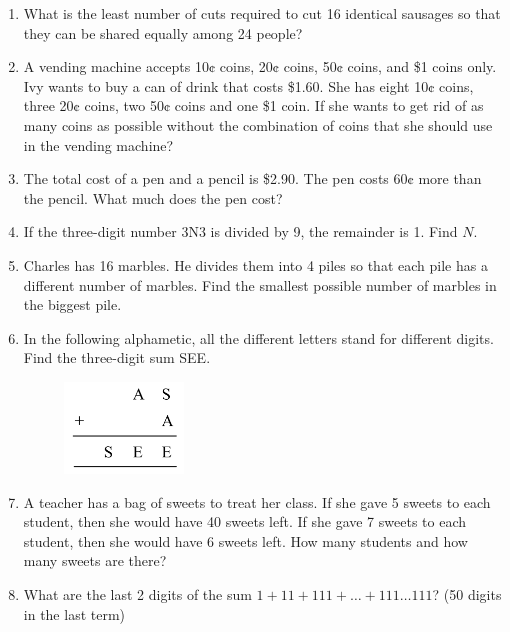 \documentclass[11pt]{scrartcl}
\begin{document}
\begin{enumerate}
    \item What is the least number of cuts required to cut 16 identical sausages so that they can be shared equally among 24 people?
    
    \item A vending machine accepts 10¢ coins, 20¢ coins, 50¢ coins, and \$1 coins only. Ivy wants to buy a can of drink that costs \$1.60. She has eight 10¢ coins, three 20¢ coins, two 50¢ coins and one \$1 coin. If she wants to get rid of as many coins as possible without the combination of coins that she should use in the vending machine?

       \item The total cost of a pen and a pencil is \$2.90. The pen costs 60¢ more than the pencil. What much does the pen cost?
    
    \item If the three-digit number 3N3 is divided by 9, the remainder is 1. Find \( N \).
    
    \item Charles has 16 marbles. He divides them into 4 piles so that each pile has a different number of marbles. Find the smallest possible number of marbles in the biggest pile.

    \item In the following alphametic, all the different letters stand for different digits. Find the three-digit sum SEE.
    \begin{figure}[h]
        \centering
        \includegraphics[width=0.3\textwidth]{Test For Pelatihan/G7-8 and G3-4/see.png}
    \end{figure}
    
    \item A teacher has a bag of sweets to treat her class. If she gave 5 sweets to each student, then she would have 40 sweets left. If she gave 7 sweets to each student, then she would have 6 sweets left. How many students and how many sweets are there?
    
    \item What are the last 2 digits of the sum \( 1 + 11 + 111 + \ldots + 111\ldots111 \)? (50 digits in the last term)
    

\end{enumerate}
\end{document}
